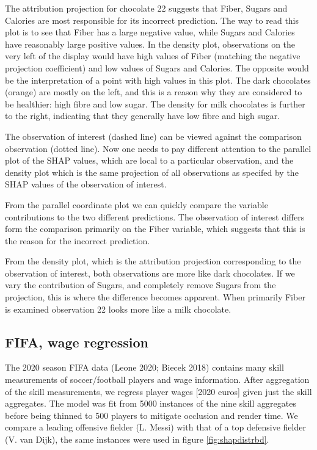 \documentclass[
]{article}
\begin{document}
The attribution projection for chocolate 22 suggests that Fiber, Sugars and Calories are most responsible for its incorrect prediction. The way to read this plot is to see that Fiber has a large negative value, while Sugars and Calories have reasonably large positive values. In the density plot, observations on the very left of the display would have high values of Fiber (matching the negative projection coefficient) and low values of Sugars and Calories. The opposite would be the interpretation of a point with high values in this plot. The dark chocolates (orange) are mostly on the left, and this is a reason why they are considered to be healthier: high fibre and low sugar. The density for milk chocolates is further to the right, indicating that they generally have low fibre and high sugar.

The observation of interest (dashed line) can be viewed against the comparison observation (dotted line). Now one needs to pay different attention to the parallel plot of the SHAP values, which are local to a particular observation, and the density plot which is the same projection of all observations as specifed by the SHAP values of the observation of interest.

From the parallel coordinate plot we can quickly compare the variable contributions to the two different predictions. The observation of interest differs form the comparison primarily on the Fiber variable, which suggests that this is the reason for the incorrect prediction.

From the density plot, which is the attribution projection corresponding to the observation of interest, both observations are more like dark chocolates. If we vary the contribution of Sugars, and completely remove Sugars from the projection, this is where the difference becomes apparent. When primarily Fiber is examined observation 22 looks more like a milk chocolate.

\hypertarget{fifa-wage-regression}{%
\subsection{FIFA, wage regression}\label{fifa-wage-regression}}

The 2020 season FIFA data (Leone 2020; Biecek 2018) contains many skill measurements of soccer/football players and wage information. After aggregation of the skill measurements, we regress player wages {[}2020 euros{]} given just the skill aggregates. The model was fit from 5000 instances of the nine skill aggregates before being thinned to 500 players to mitigate occlusion and render time. We compare a leading offensive fielder (L. Messi) with that of a top defensive fielder (V. van Dijk), the same instances were used in figure \ref{fig:shapdistrbd}.
\end{document}
